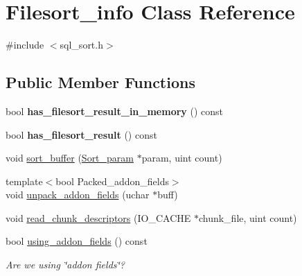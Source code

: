 \hypertarget{classFilesort__info}{}\section{Filesort\+\_\+info Class Reference}
\label{classFilesort__info}


{\ttfamily \#include $<$sql\+\_\+sort.\+h$>$}

\subsection*{Public Member Functions}
\begin{DoxyCompactItemize}
\item 
\mbox{\label{classFilesort__info_ac6f74037f7331a62554984b89bb248aa}} 
bool {\bfseries has\+\_\+filesort\+\_\+result\+\_\+in\+\_\+memory} () const
\item 
\mbox{\label{classFilesort__info_a8c33a4f81840c88a3faa66f3a7f944c0}} 
bool {\bfseries has\+\_\+filesort\+\_\+result} () const
\item 
void \mbox{\hyperlink{classFilesort__info_a1112e3f4717a0cc05c50c94ef3b21c1a}{sort\+\_\+buffer}} (\mbox{\hyperlink{classSort__param}{Sort\+\_\+param}} $\ast$param, uint count)
\item 
{\footnotesize template$<$bool Packed\+\_\+addon\+\_\+fields$>$ }\\void \mbox{\hyperlink{classFilesort__info_a972ae7583ff223e13df5b6d6cf4d0de8}{unpack\+\_\+addon\+\_\+fields}} (uchar $\ast$buff)
\item 
void \mbox{\hyperlink{classFilesort__info_a709c489a4586b82aabd8020bff21a64a}{read\+\_\+chunk\+\_\+descriptors}} (I\+O\+\_\+\+C\+A\+C\+HE $\ast$chunk\+\_\+file, uint count)
\item 
\mbox{\label{classFilesort__info_a6d3ff1e4085144d8bbace6a8f4f506e2}} 
bool \mbox{\hyperlink{classFilesort__info_a6d3ff1e4085144d8bbace6a8f4f506e2}{using\+\_\+addon\+\_\+fields}} () const
\begin{DoxyCompactList}\small\item\em Are we using \char`\"{}addon fields\char`\"{}? \end{DoxyCompactList}\item 
\mbox{\label{classFilesort__info_a4c21080320673a7577be06d71e37d24f}} 

\end{DoxyCompactItemize}

